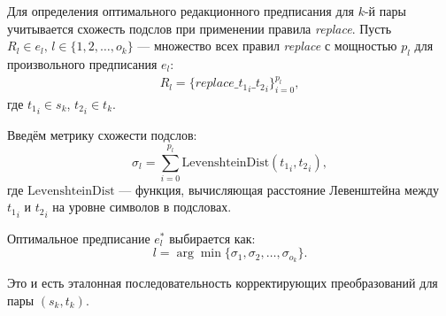 Для определения оптимального редакционного предписания для $k$-й пары учитывается схожесть подслов при применении правила \textit{replace}. Пусть $R_l \in e_l, \, l \in \{1, 2, \ldots, o_k\}$ — множество всех правил \textit{replace} с мощностью $p_l$ для произвольного предписания $e_l$:
\begin{align*}
    R_l =\{replace\_{t_1}_{i}\_{t_2}_{i}\}_{i=0}^{p_l}, 
\end{align*}
где ${t_1}_i \in s_k$, ${t_2}_i \in t_k$.

Введём метрику схожести подслов:
\[
\sigma_l = \sum_{i=0}^{p_l} \text{LevenshteinDist}({t_1}_i, {t_2}_i),
\]
где $\text{LevenshteinDist}$ — функция, вычисляющая расстояние Левенштейна между ${t_1}_i$ и ${t_2}_i$ на уровне символов в подсловах.

Оптимальное предписание $e^*_l$ выбирается как:
\[
l = \arg\min \{\sigma_1, \sigma_2, \ldots, \sigma_{o_k}\}.
\]

Это и есть эталонная последовательность корректирующих преобразований для пары $(s_k, t_k)$.
